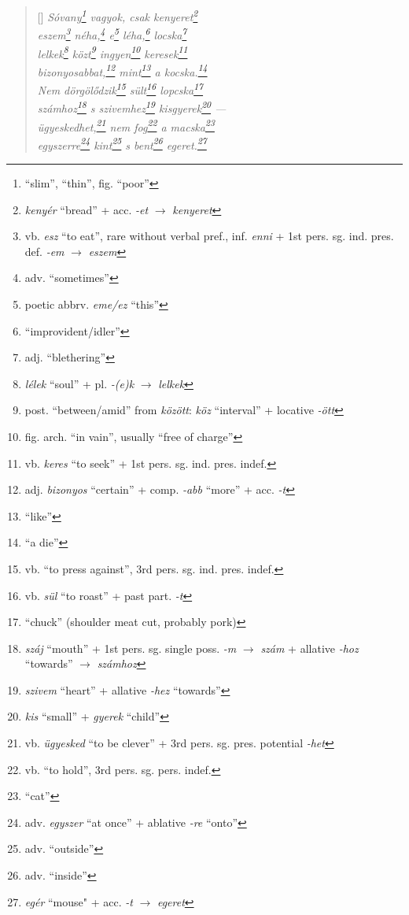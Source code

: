 \documentclass[a4paper,12pt,twoside,final]{book}
\begin{document}
\begin{verse}[\versewidth]
  \it
  Sóvany\footnote{``slim'', ``thin'', fig. ``poor''} vagyok, csak
  kenyeret\footnote{\emph{kenyér} ``bread'' + acc. \emph{-et}
  $\rightarrow$ \emph{kenyeret}} \\
  eszem\footnote{vb. \emph{esz} ``to eat'', rare without verbal
  pref., inf. \emph{enni} + 1st pers. sg. ind. pres. def. \emph{-em}
  $\rightarrow$ \emph{eszem}} néha,\footnote{adv. ``sometimes''} e\footnote{poetic
  abbrv. \emph{eme/ez} ``this''} léha,\footnote{``improvident/idler''}
  locska\footnote{adj. ``blethering''} \\
  lelkek\footnote{\emph{lélek} ``soul'' +
  pl. \emph{-(e)k} $\rightarrow$ \emph{lelkek}}
  közt\footnote{post. ``between/amid'' from \emph{között}: \emph{köz}
  ``interval'' + locative \emph{-ött}} ingyen\footnote{fig. arch. ``in
  vain'', usually ``free of charge''} keresek\footnote{vb.
  \emph{keres} ``to seek'' + 1st pers. sg. ind. pres. indef.} \\
  bizonyosabbat,\footnote{adj. \emph{bizonyos} ``certain'' +
  comp. \emph{-abb} ``more'' + acc. \emph{-t}} mint\footnote{``like''} a
  kocska.\footnote{``a die''} \\
  Nem dörgölődzik\footnote{vb. ``to press against'', 3rd
  pers. sg. ind. pres. indef.} sült\footnote{vb. \emph{sül} ``to
  roast''  + past part. \emph{-t}} lopcska\footnote{``chuck''
  (shoulder meat cut, probably pork)} \\
  számhoz\footnote{\emph{száj} ``mouth'' + 1st
  pers. sg. single poss. \emph{-m} $\rightarrow$ \emph{szám} +
  allative \emph{-hoz} ``towards'' $\rightarrow$ \emph{számhoz}} s
  szivemhez\footnote{\emph{szivem} ``heart'' +
  allative \emph{-hez} ``towards''} kisgyerek\footnote{\emph{kis} ``small'' +
  \emph{gyerek} ``child''} --- \\
  ügyeskedhet,\footnote{vb. \emph{ügyesked} ``to be clever'' +
  3rd pers. sg. pres. potential \emph{-het}} nem fog\footnote{vb.
  ``to hold'', 3rd pers. sg. pers. indef.} a macska\footnote{``cat''} \\
  egyszerre\footnote{adv. \emph{egyszer} ``at once'' +
  ablative \emph{-re} ``onto''} kint\footnote{adv. ``outside''} s
  bent\footnote{adv. ``inside''} egeret.\footnote{\emph{egér}
  ``mouse" + acc. \emph{-t} $\rightarrow$ \emph{egeret}}
\end{verse}

\newpage


\settowidth{\versewidth}{each thing constricts, presses against,}
\end{document}
